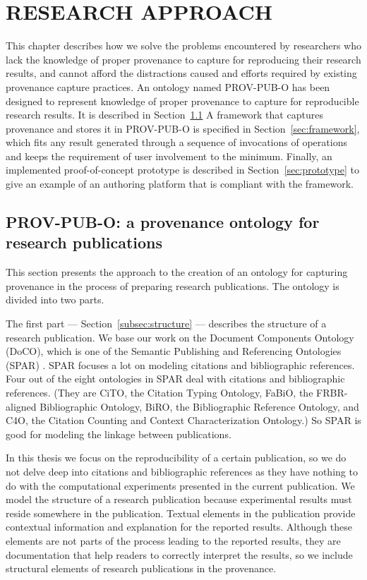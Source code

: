 \chapter{RESEARCH APPROACH}
\label{research-approach}

This chapter describes how we solve the problems encountered by researchers who lack the knowledge of proper provenance to capture for reproducing their research results, and cannot afford the distractions caused and efforts required by existing provenance capture practices. An ontology named PROV-PUB-O has been designed to represent knowledge of proper provenance to capture for reproducible research results. It is described in Section~\ref{sec:ontology} A framework that captures provenance and stores it in PROV-PUB-O is specified in Section~\ref{sec:framework}, which fits any result generated through a sequence of invocations of operations and keeps the requirement of user involvement to the minimum. Finally, an implemented proof-of-concept prototype is described in Section~\ref{sec:prototype} to give an example of an authoring platform that is compliant with the framework.

\section{PROV-PUB-O: a provenance ontology for research publications}
\label{sec:ontology}
This section presents the approach to the creation of an ontology for capturing provenance in the process of preparing research publications. The ontology is divided into two parts. 

The first part --- Section~\ref{subsec:structure} --- describes the structure of a research publication. We base our work on the Document Components Ontology (DoCO), which is one of the Semantic Publishing and Referencing Ontologies (SPAR) \cite{peroni2014semantic}. SPAR focuses a lot on modeling citations and bibliographic references. Four out of the eight ontologies in SPAR deal with citations and bibliographic references. (They are CiTO, the Citation Typing Ontology, FaBiO, the FRBR-aligned Bibliographic Ontology, BiRO, the Bibliographic Reference Ontology, and C4O, the Citation Counting and Context Characterization Ontology.) So SPAR is good for modeling the linkage between publications. 

In this thesis we focus on the reproducibility of a certain publication, so we do not delve deep into citations and bibliographic references as they have nothing to do with the computational experiments presented in the current publication. We model the structure of a research publication because experimental results must reside somewhere in the publication. Textual elements in the publication provide contextual information and explanation for the reported results. Although these elements are not parts of the process leading to the reported results, they are documentation that help readers to correctly interpret the results, so we include structural elements of research publications in the provenance.

